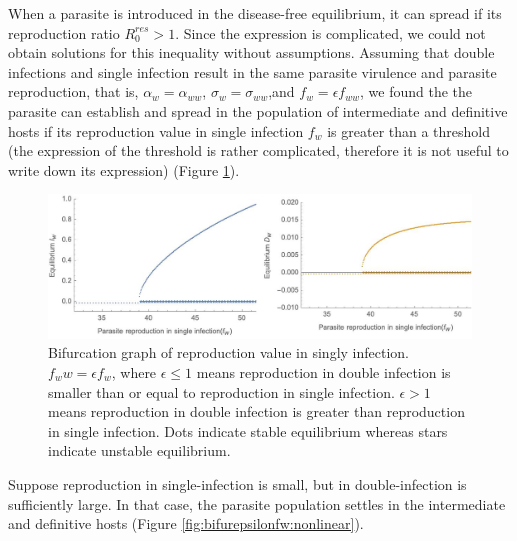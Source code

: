 \documentclass{article}
\begin{document}
When a parasite is introduced in the disease-free equilibrium, it can spread if its reproduction ratio $R_0^{res} > 1$. 
Since the expression is complicated, we could not obtain solutions for this inequality without assumptions. 
Assuming that double infections and single infection result in the same parasite virulence and parasite reproduction, that is, $\alpha_w = \alpha_{ww}$, $\sigma_w = \sigma_{ww}$,and $f_w = \epsilon f_{ww}$, we found the the parasite can establish and spread in the population of intermediate and definitive hosts if its reproduction value in single infection $f_w$ is greater than a threshold (the expression of the threshold is rather complicated, therefore it is not useful to write down its expression) (Figure \ref{fig:bifurfw:nonlinear}).

\begin{figure}
\includegraphics[width=\textwidth]{Figures/bifurcation_fw_NL.jpg}
\caption{Bifurcation graph of reproduction value in singly infection. $f_ww = \epsilon f_w$, where $\epsilon \leq 1$ means reproduction in double infection is smaller than or equal to reproduction in single infection. $\epsilon > 1$ means reproduction in double infection is greater than reproduction in single infection. Dots indicate stable equilibrium whereas stars indicate unstable equilibrium.}
\label{fig:bifurfw:nonlinear}
\end{figure}

Suppose reproduction in single-infection is small, but in double-infection is sufficiently large. 
In that case, the parasite population settles in the intermediate and definitive hosts (Figure \ref{fig:bifurepsilonfw:nonlinear}).
\end{document}
